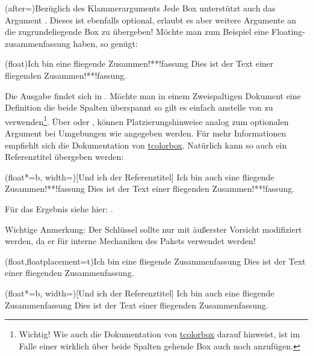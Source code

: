 \documentclass[ngerman]{article}
\def\cmd#1{\texttt{\paletteA{\textbackslash#1}}}
\def\env#1{\texttt{\paletteB{#1}}}
\def\arg#1{\textit{\paletteB{#1}}}
\begin{document}
\begin{bemerkung*}(after=\bigskip){Bezüglich des Klammerarguments}
    \label{bem:optbracekey}Jede Box unterstützt auch das Argument \arg{Boxargs}. Dieses ist ebenfalls optional, erlaubt es aber weitere Argumente an die zugrundeliegende Box zu übergeben!
    Möchte man zum Beispiel eine Floating-zusammenfassung haben, so genügt:
\begin{latex}
\begin{zusammenfassung}(float){Ich bin eine fliegende Zusammen!**!fassung}
    Dies ist der Text einer fliegenden Zusammen!**!fassung.
\end{zusammenfassung}
\end{latex}
    Die Ausgabe findet sich in .
    Möchte man in einem Zweispaltigen Dokument eine Definition die beide Spalten überspannt so gilt es einfach  anstelle von  zu verwenden\footnote{Wichtig! Wie auch die Dokumentation von \href{https://www.ctan.org/pkg/tcolorbox}{tcolorbox} darauf hinweist, ist im Falle einer wirklich über beide Spalten gehende Box auch noch \T{width=\cmd{textwidth}} anzufügen.}. Über  oder , können Platzierungshinweise analog zum optionalen Argument bei Umgebungen wie \env{figure} angegeben werden. Für mehr Informationen empfiehlt sich die Dokumentation von \href{https://www.ctan.org/pkg/tcolorbox}{tcolorbox}.
    Natürlich kann so auch ein Referenztitel übergeben werden:
\begin{latex}
\begin{zusammenfassung}(float*=b, width=\textwidth)[Und ich der Referenztitel]
            {Ich bin auch eine fliegende Zusammen!**!fassung}
    Dies ist der Text einer fliegenden Zusammen!**!fassung.
\end{zusammenfassung}
\end{latex}
Für das Ergebnis siehe hier: .

Wichtige Anmerkung: Der Schlüssel  sollte nur mit äußerster Vorsicht modifiziert werden, da er für interne Mechaniken des Pakets verwendet werden!
\end{bemerkung*}

\begin{zusammenfassung}(float,floatplacement=t){Ich bin eine fliegende Zusammenfassung}
    \label{zsf:floatingex}Dies ist der Text einer fliegenden Zusammenfassung.
\end{zusammenfassung}

\begin{zusammenfassung}(float*=b, width=\textwidth)[Und ich der Referenztitel]
            {Ich bin auch eine fliegende Zusammenfassung}
    \label{zsf:floatingex2}Dies ist der Text einer fliegenden Zusammenfassung.
\end{zusammenfassung}
\end{document}

